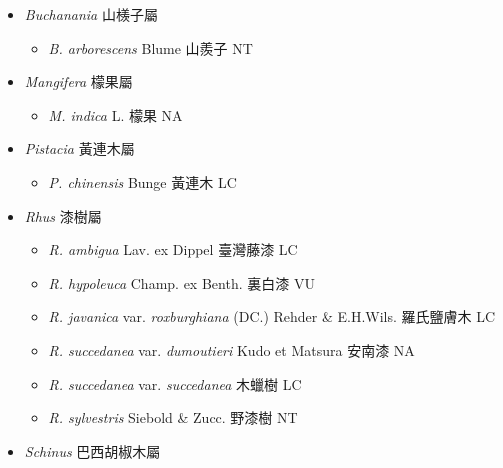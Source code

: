 
  \begin{itemize}
 \item[] \textit{Buchanania} 山檨子屬
                                
  \begin{itemize}
        \item[] \textit{B. arborescens} Blume  山羨子   NT
  \end{itemize}
 \item[] \textit{Mangifera} 檬果屬
                                
  \begin{itemize}
        \item[] \textit{M. indica} L.  檬果   NA
  \end{itemize}
 \item[] \textit{Pistacia} 黃連木屬
                                
  \begin{itemize}
        \item[] \textit{P. chinensis} Bunge  黃連木   LC
  \end{itemize}
 \item[] \textit{Rhus} 漆樹屬
                                
  \begin{itemize}
        \item[] \textit{R. ambigua} Lav. ex Dippel  臺灣藤漆   LC
        \item[] \textit{R. hypoleuca} Champ. ex Benth.  裏白漆   VU
        \item[] \textit{R. javanica} var. \textit{roxburghiana} (DC.) Rehder \& E.H.Wils.  羅氏鹽膚木   LC
        \item[] \textit{R. succedanea} var. \textit{dumoutieri} Kudo et Matsura  安南漆   NA
        \item[] \textit{R. succedanea} var. \textit{succedanea}   木蠟樹   LC
        \item[] \textit{R. sylvestris} Siebold \& Zucc.  野漆樹   NT
  \end{itemize}
 \item[] \textit{Schinus} 巴西胡椒木屬
                                

\end{itemize}
